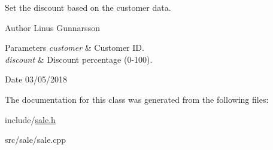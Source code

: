 Set the discount based on the customer data. \begin{DoxyAuthor}{Author}
Linus Gunnarsson 
\end{DoxyAuthor}

\begin{DoxyParams}{Parameters}
{\em customer} & Customer ID. \\
\hline
{\em discount} & Discount percentage (0-\/100). \\
\hline
\end{DoxyParams}
\begin{DoxyDate}{Date}
03/05/2018 
\end{DoxyDate}


The documentation for this class was generated from the following files\+:\begin{DoxyCompactItemize}
\item 
include/\mbox{\hyperlink{sale_8h}{sale.\+h}}\item 
src/sale/sale.\+cpp\end{DoxyCompactItemize}
